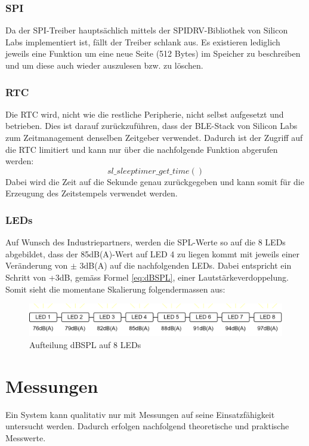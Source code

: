 \documentclass[12pt]{article}
\begin{document}
	\subsubsection*{SPI}
	Da der SPI-Treiber hauptsächlich mittels der SPIDRV-Bibliothek von Silicon Labs implementiert ist, fällt der Treiber schlank aus. Es existieren lediglich jeweils eine Funktion um eine neue Seite (512 Bytes) im Speicher zu beschreiben und um diese auch wieder auszulesen bzw. zu löschen.
	\subsubsection*{RTC}
	Die RTC wird, nicht wie die restliche Peripherie, nicht selbst aufgesetzt und betrieben. Dies ist darauf zurückzuführen, dass der BLE-Stack von Silicon Labs zum Zeitmanagement denselben Zeitgeber verwendet. Dadurch ist der Zugriff auf die RTC limitiert und kann nur über die nachfolgende Funktion abgerufen werden:
	$$ sl\_sleeptimer\_get\_time() $$
	Dabei wird die Zeit auf die Sekunde genau zurückgegeben und kann somit für die Erzeugung des Zeitstempels verwendet werden.
	\subsubsection*{LEDs} \label{LEDs}
	Auf Wunsch des Industriepartners, werden die SPL-Werte so auf die 8 LEDs abgebildet, dass der 85dB(A)-Wert auf LED 4 zu liegen kommt mit jeweils einer Veränderung von $\pm$ 3dB(A) auf die nachfolgenden LEDs. Dabei entspricht ein Schritt von +3dB, gemäss Formel \ref{eq:dBSPL}, einer Lautstärkeverdoppelung. Somit sieht die momentane Skalierung folgendermassen aus:
	\begin{figure}[H]
		\centering
		\includegraphics[width=1\linewidth]{images/BAT_Skalierung-SPL-auf-LED}
		\caption{Aufteilung dBSPL auf 8 LEDs}
		\label{fig:batskalierung-spl-auf-led}
	\end{figure}
	
	
	\newpage
	\section{Messungen}\label{Messungen}
	Ein System kann qualitativ nur mit Messungen auf seine Einsatzfähigkeit untersucht werden. Dadurch erfolgen nachfolgend theoretische und praktische Messwerte.
\end{document}
